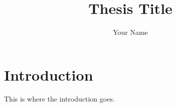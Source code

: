 \documentclass{article}
\title{Thesis Title}
\author{Your Name}
\begin{document}
\maketitle
\section{Introduction}
This is where the introduction goes.
\end{document}
